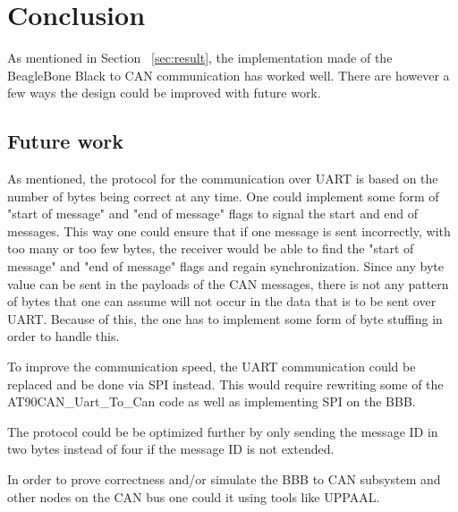 
\section{Conclusion}\label{sec:conclusion}
As mentioned in Section ~\ref{sec:result}, the implementation made of the BeagleBone Black to CAN communication has worked well. There are however a few ways the design could be improved with future work.

\subsection{Future work}
As mentioned, the protocol for the communication over UART is based on the number of bytes being correct at any time. One could implement some form of "start of message" and "end of message" flags to signal the start and end of messages. This way one could ensure that if one message is sent incorrectly, with too many or too few bytes, the receiver would be able to find the "start of message" and "end of message" flags and regain synchronization. \newline
Since any byte value can be sent in the payloads of the CAN messages, there is not any pattern of bytes that one can assume will not occur in the data that is to be sent over UART. Because of this, the one has to implement some form of byte stuffing in order to handle this.

To improve the communication speed, the UART communication could be replaced and be done via SPI instead. This would require rewriting some of the AT90CAN\_Uart\_To\_Can code as well as implementing SPI on the BBB.

The protocol could be be optimized further by only sending the message ID in two bytes instead of four if the message ID is not extended.

In order to prove correctness and/or simulate the BBB to CAN subsystem and other nodes on the CAN bus one could it using tools like UPPAAL.
